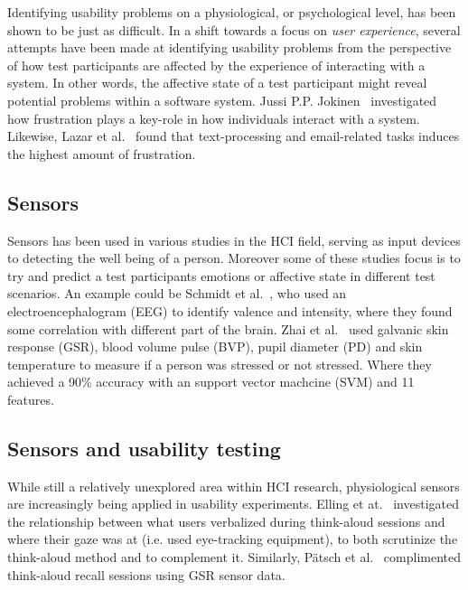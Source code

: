 Identifying usability problems on a physiological, or psychological level, has been shown to be just as difficult. In a
shift towards a focus on \textit{user experience}, several attempts have been made at identifying usability problems
from the perspective of how test participants are affected by the experience of interacting with a system. In other
words, the affective state of a test participant might reveal potential problems within a software system. Jussi
P.P. Jokinen~\cite{workplace_up_study} investigated how frustration plays a key-role in how individuals interact with a
system. Likewise, Lazar et al.~\cite{frustration_with_computers} found that text-processing and email-related tasks
induces the highest amount of frustration.

\subsection{Sensors} %
Sensors has been used in various studies in the HCI field, serving as input devices to detecting the well being of a person.
Moreover some of these studies focus is to try and predict a test participants emotions or affective state in different test scenarios. 
An example could be Schmidt et al.~\cite{schmidt_trainor}, who used an electroencephalogram (EEG) to identify valence and intensity, where they found some correlation with different part of the brain.
Zhai et al.~\cite{gsr_data_processing2} used galvanic skin response (GSR), blood volume pulse (BVP), pupil diameter (PD) and skin temperature to measure if a person was stressed or not stressed. Where they achieved a 90\% accuracy with an support vector machcine (SVM) and 11 features.

\subsection{Sensors and usability testing}
While still a relatively unexplored area within HCI research,
physiological sensors are increasingly being applied in usability experiments.
Elling et at.~\cite{concurrent_think_aloud_eye_tracking} investigated the
relationship between what users verbalized during think-aloud sessions and where
their gaze was at (i.e. used eye-tracking equipment), to both scrutinize the
think-aloud method and to complement it. Similarly, P\"{a}tsch et
al.~\cite{using_sensor_graphs_think_aloud} complimented think-aloud recall
sessions using GSR sensor data.

